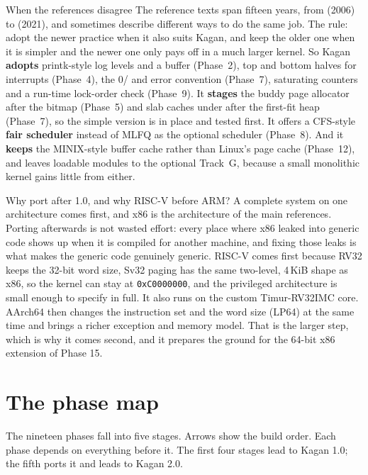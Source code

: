 \documentclass[11pt,a4paper]{article}
\begin{document}
\begin{decisionbox}{When the references disagree}
The reference texts span fifteen years, from \OSDI (2006) to \LKP (2021), and sometimes describe different ways to
do the same job. The rule: adopt the newer practice when it also suits Kagan, and keep the older one when it is
simpler and the newer one only pays off in a much larger kernel. So Kagan
\textbf{adopts} printk-style log levels and a  buffer (Phase~2), top and bottom halves for interrupts
(Phase~4), the 0/ and  error convention (Phase~7), saturating  counters and
a run-time lock-order check (Phase~9). It \textbf{stages} the buddy page allocator after the bitmap (Phase~5) and
slab caches under  after the first-fit heap (Phase~7), so the simple version is in place and tested first. It
offers a CFS-style \textbf{fair scheduler} instead of MLFQ as the optional scheduler (Phase~8). And it
\textbf{keeps} the MINIX-style buffer cache rather than Linux's page cache (Phase~12), and leaves loadable modules
to the optional Track~G, because a small monolithic kernel gains little from either.
\end{decisionbox}

\begin{decisionbox}{Why port after 1.0, and why RISC-V before ARM?}
A complete system on one architecture comes first, and x86 is the architecture of the main references. Porting
afterwards is not wasted effort: every place where x86 leaked into generic code shows up when it is compiled for
another machine, and fixing those leaks is what makes the generic code genuinely generic. RISC-V
comes first because RV32 keeps the 32-bit word size, Sv32 paging has the same two-level, 4\,KiB shape as x86, so
the kernel can stay at \texttt{0xC0000000}, and the privileged architecture is small enough to specify in full. It
also runs on the custom Timur-RV32IMC core. AArch64 then changes the instruction set and the word size
(LP64) at the same time and brings a richer exception and memory model. That is the larger step, which is why it comes
second, and it prepares the ground for the 64-bit x86 extension of Phase 15.
\end{decisionbox}

\section{The phase map}

The nineteen phases fall into five stages. Arrows show the build order. Each phase depends on everything before it.
The first four stages lead to Kagan 1.0; the fifth ports it and leads to Kagan 2.0.
\end{document}
